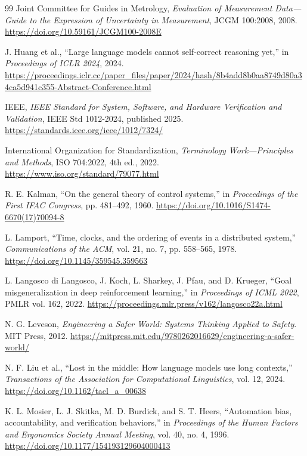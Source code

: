 \documentclass[10pt,a4paper]{article}
\begin{document}
\begin{thebibliography}{99}
Joint Committee for Guides in Metrology, \emph{Evaluation of Measurement Data---Guide to the Expression of Uncertainty in Measurement}, JCGM 100:2008, 2008. \url{https://doi.org/10.59161/JCGM100-2008E}

J. Huang et al., ``Large language models cannot self-correct reasoning yet,'' in \emph{Proceedings of ICLR 2024}, 2024. \url{https://proceedings.iclr.cc/paper_files/paper/2024/hash/8b4add8b0aa8749d80a34ca5d941c355-Abstract-Conference.html}

IEEE, \emph{IEEE Standard for System, Software, and Hardware Verification and Validation}, IEEE Std 1012-2024, published 2025. \url{https://standards.ieee.org/ieee/1012/7324/}

International Organization for Standardization, \emph{Terminology Work---Principles and Methods}, ISO 704:2022, 4th ed., 2022. \url{https://www.iso.org/standard/79077.html}

R. E. Kalman, ``On the general theory of control systems,'' in \emph{Proceedings of the First IFAC Congress}, pp. 481--492, 1960. \url{https://doi.org/10.1016/S1474-6670(17)70094-8}

L. Lamport, ``Time, clocks, and the ordering of events in a distributed system,'' \emph{Communications of the ACM}, vol. 21, no. 7, pp. 558--565, 1978. \url{https://doi.org/10.1145/359545.359563}

L. Langosco di Langosco, J. Koch, L. Sharkey, J. Pfau, and D. Krueger, ``Goal misgeneralization in deep reinforcement learning,'' in \emph{Proceedings of ICML 2022}, PMLR vol. 162, 2022. \url{https://proceedings.mlr.press/v162/langosco22a.html}

N. G. Leveson, \emph{Engineering a Safer World: Systems Thinking Applied to Safety}. MIT Press, 2012. \url{https://mitpress.mit.edu/9780262016629/engineering-a-safer-world/}

N. F. Liu et al., ``Lost in the middle: How language models use long contexts,'' \emph{Transactions of the Association for Computational Linguistics}, vol. 12, 2024. \url{https://doi.org/10.1162/tacl_a_00638}

K. L. Mosier, L. J. Skitka, M. D. Burdick, and S. T. Heers, ``Automation bias, accountability, and verification behaviors,'' in \emph{Proceedings of the Human Factors and Ergonomics Society Annual Meeting}, vol. 40, no. 4, 1996. \url{https://doi.org/10.1177/154193129604000413}


\end{thebibliography}
\end{document}
